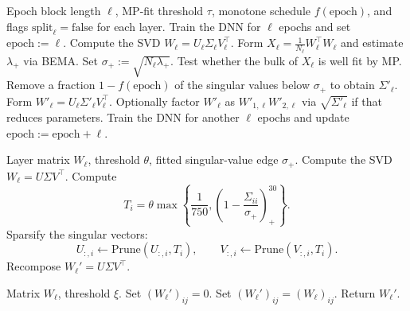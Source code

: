 \documentclass[11pt]{article}
\theoremstyle{plain}
\theoremstyle{definition}
\theoremstyle{remark}
\DeclarePairedDelimiter{\abs}{\lvert}{\rvert}
\newcommand{\1}{\mathbf{1}}
\begin{document}
\begin{algorithm}[H]
\caption{MP-based pruning algorithm for the fully connected examples}
\label{algo_1}
\begin{algorithmic}[1]
\Require Epoch block length \(\ell\), MP-fit threshold \(\tau\), monotone schedule \(f(\mathrm{epoch})\), and flags \(\mathrm{split}_\ell=\mathrm{false}\) for each layer.
\State Train the DNN for \(\ell\) epochs and set \(\mathrm{epoch}:=\ell\).
    \State Compute the SVD \(W_\ell=U_\ell\Sigma_\ell V_\ell^\top\).
    \State Form \(X_\ell=\frac1{N_\ell}W_\ell^\top W_\ell\) and estimate \(\lambda_+\) via BEMA.
    \State Set \(\sigma_+:=\sqrt{N_\ell\lambda_+}\).
    \State Test whether the bulk of \(X_\ell\) is well fit by MP.
        \State Remove a fraction \(1-f(\mathrm{epoch})\) of the singular values below \(\sigma_+\) to obtain \(\Sigma'_\ell\).
        \State Form \(W'_\ell=U_\ell\Sigma'_\ell V_\ell^\top\).
        \State Optionally factor \(W'_\ell\) as \(W'_{1,\ell}W'_{2,\ell}\) via \(\sqrt{\Sigma'_\ell}\) if that reduces parameters.
    \EndIf
\EndFor
\State Train the DNN for another \(\ell\) epochs and update \(\mathrm{epoch}:=\mathrm{epoch}+\ell\).
\EndWhile
\end{algorithmic}
\end{algorithm}

\begin{algorithm}[H]
\caption{Sparsify singular vectors}
\label{spar_sing_vectors}
\begin{algorithmic}[1]
\Require Layer matrix \(W_\ell\), threshold \(\theta\), fitted singular-value edge \(\sigma_+\).
\State Compute the SVD \(W_\ell=U\Sigma V^\top\).
    \State Compute
    \[
    T_i=\theta\max\left\{\frac1{750},\left(1-\frac{\Sigma_{ii}}{\sigma_+}\right)_+^{30}\right\}.
    \]
    \State Sparsify the singular vectors:
    \[
    U_{:,i}\leftarrow \mathrm{Prune}(U_{:,i},T_i),
    \qquad
    V_{:,i}\leftarrow \mathrm{Prune}(V_{:,i},T_i).
    \]
\EndFor
\State Recompose \(W_\ell'=U\Sigma V^\top\).
\end{algorithmic}
\end{algorithm}

\begin{algorithm}[H]
\caption{Element-wise sparsification}
\label{spars_algo}
\begin{algorithmic}[1]
\Require Matrix \(W_\ell\), threshold \(\xi\).
        \State Set \((W_\ell')_{ij}=0\).
    \Else
        \State Set \((W_\ell')_{ij}=(W_\ell)_{ij}\).
    \EndIf
\EndFor
\State Return \(W_\ell'\).
\end{algorithmic}
\end{algorithm}
\end{document}
